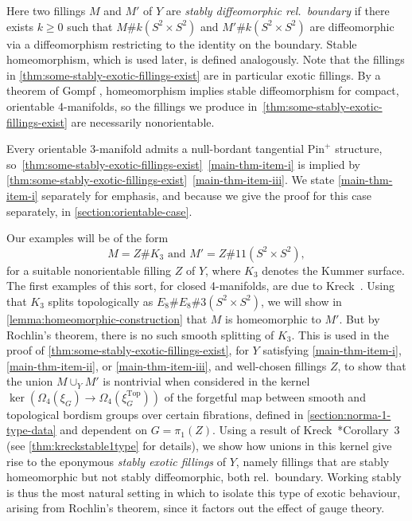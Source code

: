 \documentclass[a4paper, reqno]{amsart}
\theoremstyle{definition}
\theoremstyle{remark}
\newcommand{\pinplus}{{\mathrm{Pin}^+}\!}
\newcommand{\Top}{\mathrm{Top}}
\begin{document}
Here two fillings $M$ and $M'$ of $Y$ are \emph{stably diffeomorphic rel.\ boundary} if there exists $k\geq 0$ such that $M \# k(S^2 \times S^2)$ and $M' \# k(S^2 \times S^2)$ are diffeomorphic via a diffeomorphism restricting to the identity on the boundary.
Stable homeomorphism, which is used later, is defined analogously.  
Note that the fillings in \cref{thm:some-stably-exotic-fillings-exist} are in particular exotic fillings. By a theorem of Gompf \cite{Gompf84}, homeomorphism implies stable diffeomorphism for compact, orientable 4-manifolds, so the fillings we produce in~\cref{thm:some-stably-exotic-fillings-exist} are necessarily nonorientable.

Every orientable 3-manifold admits a null-bordant tangential $\pinplus$ structure, so~\cref{thm:some-stably-exotic-fillings-exist}~\eqref{main-thm-item-i} is implied by \cref{thm:some-stably-exotic-fillings-exist}~\eqref{main-thm-item-iii}. We state \eqref{main-thm-item-i} separately for emphasis, and because we give the proof for this case separately, in \cref{section:orientable-case}. 

Our examples will be of the form
\[M = Z \# K_3 \text{ and } M' = Z \# 11(S^2 \times S^2), \]
for a suitable nonorientable filling $Z$ of $Y$, where $K_3$ denotes the Kummer surface. The first examples of this sort, for closed 4-manifolds, are due to Kreck~\cite{Kreck84}. 
Using that $K_3$ splits topologically as $E_8 \# E_8 \# 3(S^2 \times S^2)$, we will show in \cref{lemma:homeomorphic-construction} that $M$ is homeomorphic to $M'$. But by Rochlin's theorem, there is no such smooth splitting of $K_3$. This is used in the proof of \cref{thm:some-stably-exotic-fillings-exist}, for $Y$ satisfying \eqref{main-thm-item-i}, \eqref{main-thm-item-ii}, or \eqref{main-thm-item-iii}, and  well-chosen fillings $Z$, to show that the union $M \cup_Y M'$ is nontrivial when considered in the kernel $\ker(\Omega_4(\xi_G) \to \Omega_4(\xi^{\Top}_G))$ of the forgetful map between smooth and topological bordism groups over certain fibrations, defined in \cref{section:norma-1-type-data} and dependent on $G=\pi_1(Z)$. Using a result of Kreck~\cite{surgeryandduality}*{Corollary~3} (see \cref{thm:kreckstable1type} for details), we show how unions in this kernel give rise to the eponymous \emph{stably exotic fillings} of $Y$, namely fillings that are stably homeomorphic but not stably diffeomorphic, both rel.~boundary. Working stably is thus the most natural setting in which to isolate this type of exotic behaviour, arising from Rochlin's theorem, since it factors out the effect of gauge theory. 
\end{document}
